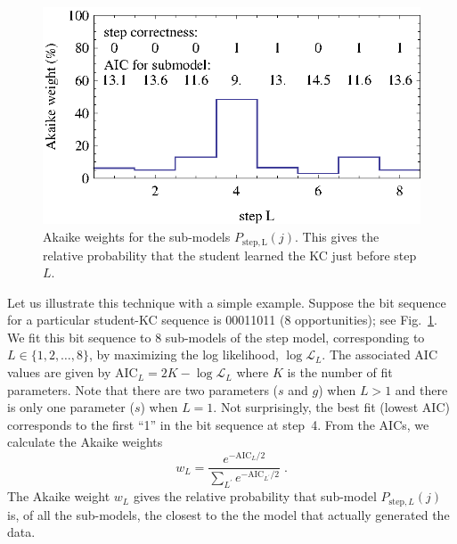 \documentclass{edm_template}
\begin{document}
\begin{figure}
  \centering \includegraphics{step-weights.eps}
   \caption{Akaike weights for the sub-models $P_\mathrm{step,L}(j)$.  
     This gives the relative probability that
      the student learned the KC just before step $L$.}
    \label{step-weights}
\end{figure}

Let us illustrate this technique with a simple example.  Suppose the
bit sequence for a particular student-KC sequence is 00011011 (8
opportunities); see Fig.~\ref{step-weights}.  We fit this bit sequence to 8
sub-models of the step model, corresponding to $L\in\{1,2,\ldots,8\}$,
by maximizing the log likelihood, $\log\mathcal{L}_L$.  The associated
AIC values are given by $\mathrm{AIC}_L=2 K-\log \mathcal{L}_L$ where
$K$ is the number of fit parameters.  Note that there are two
parameters ($s$ and $g$) when $L>1$ and there is only one parameter
($s$) when $L=1$.
%
%
Not surprisingly, the best fit (lowest AIC) corresponds to the first
``1'' in the bit sequence at step~4.  From the AICs, we calculate 
the Akaike weights
%
\begin{equation}
     w_L=\frac{e^{-\mathrm{AIC}_L/2} }{\sum_{L^\prime}
       e^{-\mathrm{AIC}_{L^\prime}/2}} \; .
\end{equation}
%
The Akaike weight $w_L$ gives the relative probability that sub-model 
$P_{\mathrm{step},L}(j)$ is, of all the sub-models, the closest to the 
the model that actually generated the data.
\end{document}
